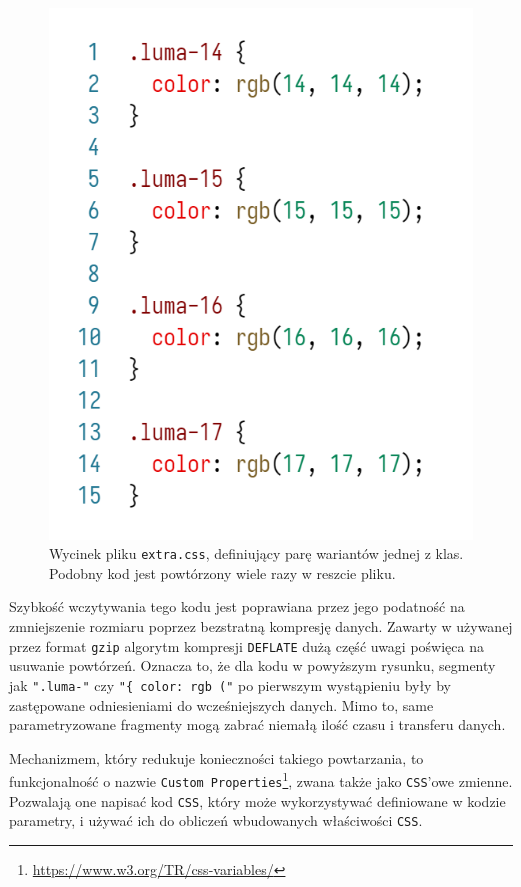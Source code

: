 \documentclass[licencjacka]{pracadypl}
\begin{document}
\begin{figure}[H]
  \centering
  \includegraphics[width=\linewidth/\real{2.5}]{images/code-css-luma.png}
  \caption{Wycinek pliku \texttt{extra.css}, definiujący parę wariantów jednej z klas. Podobny kod jest powtórzony wiele razy w reszcie pliku.}
  \label{fig:css-css-luma}
\end{figure}

Szybkość wczytywania tego kodu jest poprawiana przez jego podatność na zmniejszenie rozmiaru poprzez bezstratną kompresję danych. Zawarty w używanej przez format \texttt{gzip} algorytm kompresji \texttt{DEFLATE} dużą część uwagi poświęca na usuwanie powtórzeń. Oznacza to, że dla kodu w powyższym rysunku, segmenty jak \texttt{".luma-"} czy \texttt{"\{ color: rgb ("} po pierwszym wystąpieniu były by zastępowane odniesieniami do wcześniejszych danych. Mimo to, same parametryzowane fragmenty mogą zabrać niemałą ilość czasu i transferu danych.

Mechanizmem, który redukuje konieczności takiego powtarzania, to funkcjonalność o nazwie \texttt{Custom Properties}\footnote{\url{https://www.w3.org/TR/css-variables/}}, zwana także jako \texttt{CSS}'owe zmienne. Pozwalają one napisać kod \texttt{CSS}, który może wykorzystywać definiowane w kodzie parametry, i używać ich do obliczeń wbudowanych właściwości \texttt{CSS}.
\end{document}
